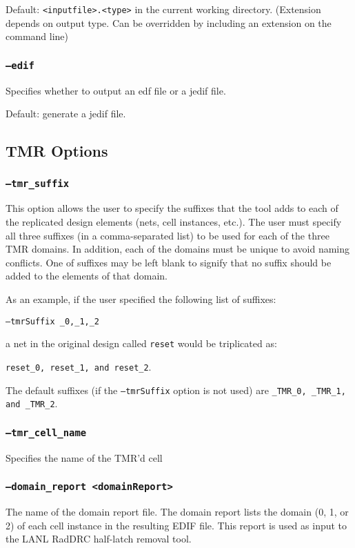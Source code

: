 Default: \texttt{<inputfile>.<type>} in the current working directory.
(Extension depends on output type. Can be overridden by including
an extension on the command line)

\subsubsection{\texttt{--edif}}
Specifies whether to output an edf file or a jedif file.

Default: generate a jedif file.

\subsection{TMR Options}
\subsubsection{\texttt{--tmr\_suffix}}
This option allows the user to specify the suffixes that the tool adds to each
of the replicated design elements (nets, cell instances, etc.). The user must
specify all three suffixes (in a comma-separated list) to be used for each of
the three TMR domains. In addition, each of the domains must be unique to avoid
naming conflicts. One of suffixes may be left blank to signify that no suffix
should be added to the elements of that domain.

As an example, if the user specified the following list of suffixes:

\texttt{--tmrSuffix \_0,\_1,\_2}

a net in the original design called \texttt{reset} would be triplicated as:

\texttt{reset\_0, reset\_1, and reset\_2}.

The default suffixes (if the \texttt{--tmrSuffix} option is not used) are 
\texttt{\_TMR\_0, \_TMR\_1, and \_TMR\_2}.

\subsubsection{\texttt{--tmr\_cell\_name}}
 Specifies the name of the TMR'd cell


\subsubsection{\texttt{--domain\_report <domainReport>}}
The name of the domain report file. The domain report lists the domain (0, 1, 
or 2) of each cell instance in the resulting EDIF file. This report is used as 
input to the LANL RadDRC half-latch removal tool. 


